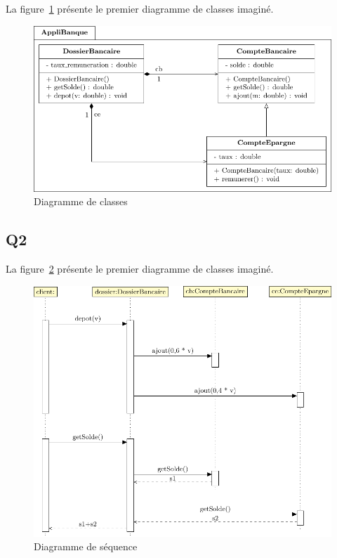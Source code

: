 \documentclass[12pt]{article}
\begin{document}
La figure~\ref{UC1} présente le premier diagramme de classes imaginé. 

\begin{figure}[h]
    \centering
    \includegraphics{Diagrammes/UML_UC1.pdf}
    \caption{Diagramme de classes\label{UC1}}
\end{figure}


\subsection{Q2}

La figure~\ref{US1} présente le premier diagramme de classes imaginé. 
\begin{figure}[h]
    \centering
    \includegraphics{Diagrammes/UML_US1.pdf}
    \caption{Diagramme de séquence\label{US1}}
\end{figure}
\end{document}
